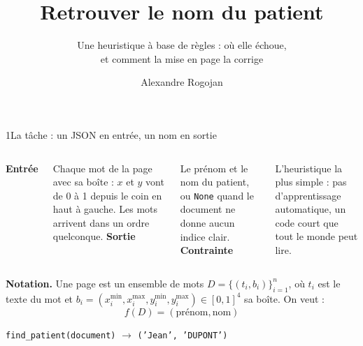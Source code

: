 \documentclass[11pt,aspectratio=169]{beamer}
\title{Retrouver le nom du patient}
\subtitle{Une heuristique à base de règles : où elle échoue,\\ et comment la mise en page la corrige}
\author{Alexandre Rogojan}
\institute{Lifen \,·\, stage Machine Learning Engineer \,·\, partie 1}
\date{}
\newcommand{\tok}[1]{\foreignlanguage{english}{\texttt{#1}}}
\begin{document}
\begin{frame}[plain]
  \titlepage
\end{frame}

\begin{frame}{1\quad La tâche : un JSON en entrée, un nom en sortie}
  \begin{columns}[T]
    \textbf{Entrée}\par\smallskip
    \small Chaque mot de la page avec sa boîte : $x$ et $y$ vont de 0 à 1 depuis le
    coin en haut à gauche. Les mots arrivent dans un ordre quelconque.
    \textbf{Sortie}\par\smallskip
    \small Le prénom et le nom du patient, ou \tok{None} quand le document ne donne aucun
    indice clair.
    \textbf{Contrainte}\par\smallskip
    \small L'heuristique la plus simple : pas d'apprentissage automatique, un code court que
    tout le monde peut lire.
  \end{columns}

  \vspace{1.4em}
  \textbf{Notation.} Une page est un ensemble de mots $D = \{(t_i, b_i)\}_{i=1}^{n}$, où
  $t_i$ est le texte du mot et $b_i = (x_i^{\min}, x_i^{\max}, y_i^{\min}, y_i^{\max}) \in [0,1]^4$
  sa boîte. On veut :
  \[
    f(D) = (\text{prénom}, \text{nom})
  \]
  \begin{center}
    \tok{find\_patient(document)} \;$\longrightarrow$\; \tok{('Jean', 'DUPONT')}
  \end{center}
\end{frame}
\end{document}
